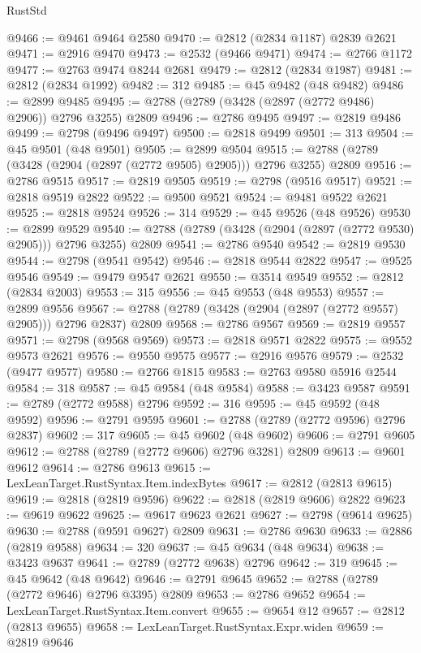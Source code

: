 \begin{lexlean}{RustStd}
\begin{coremodule}
@9466 := @9461 @9464 @2580
@9470 := @2812 (@2834 @1187) @2839 @2621
@9471 := @2916 @9470
@9473 := @2532 (@9466 @9471)
@9474 := @2766 @1172
@9477 := @2763 @9474 @8244 @2681
@9479 := @2812 (@2834 @1987)
@9481 := @2812 (@2834 @1992)
@9482 := 312
@9485 := @45 @9482 (@48 @9482)
@9486 := @2899 @9485
@9495 := @2788 (@2789 (@3428 (@2897 (@2772 @9486) @2906)) @2796 @3255) @2809
@9496 := @2786 @9495
@9497 := @2819 @9486
@9499 := @2798 (@9496 @9497)
@9500 := @2818 @9499
@9501 := 313
@9504 := @45 @9501 (@48 @9501)
@9505 := @2899 @9504
@9515 := @2788 (@2789 (@3428 (@2904 (@2897 (@2772 @9505) @2905))) @2796 @3255) @2809
@9516 := @2786 @9515
@9517 := @2819 @9505
@9519 := @2798 (@9516 @9517)
@9521 := @2818 @9519 @2822
@9522 := @9500 @9521
@9524 := @9481 @9522 @2621
@9525 := @2818 @9524
@9526 := 314
@9529 := @45 @9526 (@48 @9526)
@9530 := @2899 @9529
@9540 := @2788 (@2789 (@3428 (@2904 (@2897 (@2772 @9530) @2905))) @2796 @3255) @2809
@9541 := @2786 @9540
@9542 := @2819 @9530
@9544 := @2798 (@9541 @9542)
@9546 := @2818 @9544 @2822
@9547 := @9525 @9546
@9549 := @9479 @9547 @2621
@9550 := @3514 @9549
@9552 := @2812 (@2834 @2003)
@9553 := 315
@9556 := @45 @9553 (@48 @9553)
@9557 := @2899 @9556
@9567 := @2788 (@2789 (@3428 (@2904 (@2897 (@2772 @9557) @2905))) @2796 @2837) @2809
@9568 := @2786 @9567
@9569 := @2819 @9557
@9571 := @2798 (@9568 @9569)
@9573 := @2818 @9571 @2822
@9575 := @9552 @9573 @2621
@9576 := @9550 @9575
@9577 := @2916 @9576
@9579 := @2532 (@9477 @9577)
@9580 := @2766 @1815
@9583 := @2763 @9580 @5916 @2544
@9584 := 318
@9587 := @45 @9584 (@48 @9584)
@9588 := @3423 @9587
@9591 := @2789 (@2772 @9588) @2796
@9592 := 316
@9595 := @45 @9592 (@48 @9592)
@9596 := @2791 @9595
@9601 := @2788 (@2789 (@2772 @9596) @2796 @2837)
@9602 := 317
@9605 := @45 @9602 (@48 @9602)
@9606 := @2791 @9605
@9612 := @2788 (@2789 (@2772 @9606) @2796 @3281) @2809
@9613 := @9601 @9612
@9614 := @2786 @9613
@9615 := LexLeanTarget.RustSyntax.Item.indexBytes
@9617 := @2812 (@2813 @9615)
@9619 := @2818 (@2819 @9596)
@9622 := @2818 (@2819 @9606) @2822
@9623 := @9619 @9622
@9625 := @9617 @9623 @2621
@9627 := @2798 (@9614 @9625)
@9630 := @2788 (@9591 @9627) @2809
@9631 := @2786 @9630
@9633 := @2886 (@2819 @9588)
@9634 := 320
@9637 := @45 @9634 (@48 @9634)
@9638 := @3423 @9637
@9641 := @2789 (@2772 @9638) @2796
@9642 := 319
@9645 := @45 @9642 (@48 @9642)
@9646 := @2791 @9645
@9652 := @2788 (@2789 (@2772 @9646) @2796 @3395) @2809
@9653 := @2786 @9652
@9654 := LexLeanTarget.RustSyntax.Item.convert
@9655 := @9654 @12
@9657 := @2812 (@2813 @9655)
@9658 := LexLeanTarget.RustSyntax.Expr.widen
@9659 := @2819 @9646

\end{coremodule}
\end{lexlean}
